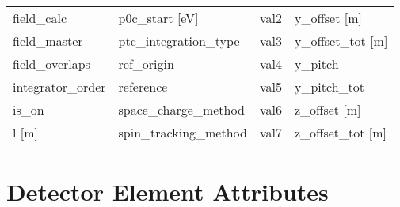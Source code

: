 \begin{tabular}{llll}
field_calc                     & p0c_start [eV]                 & val2                           & y_offset [m]                   \\
field_master                   & ptc_integration_type           & val3                           & y_offset_tot [m]               \\
field_overlaps                 & ref_origin                     & val4                           & y_pitch                        \\
integrator_order               & reference                      & val5                           & y_pitch_tot                    \\
is_on                          & space_charge_method            & val6                           & z_offset [m]                   \\
l [m]                          & spin_tracking_method           & val7                           & z_offset_tot [m]               \\
 \bottomrule
 \end{tabular}
 \vfill

 \section{Detector Element Attributes}
 \label{s:list.detector}

